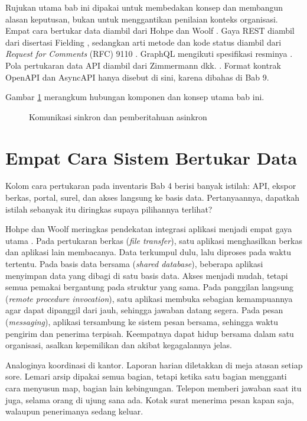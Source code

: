 Rujukan utama bab ini dipakai untuk membedakan konsep dan membangun alasan keputusan, bukan untuk menggantikan
penilaian konteks organisasi. Empat cara bertukar data diambil dari Hohpe dan Woolf \cite{c05-hohpe2003eip}. Gaya
REST diambil dari disertasi Fielding \cite{c05-fielding2000rest}, sedangkan arti metode dan kode status diambil
dari \textit{Request for Comments} (RFC) 9110 \cite{rfc9110}. GraphQL mengikuti spesifikasi resminya \cite{c05-graphql-spec}. Pola pertukaran data
API diambil dari Zimmermann dkk. \cite{zimmermann2022patterns}. Format kontrak OpenAPI \cite{openapi32} dan
AsyncAPI \cite{asyncapi31} hanya disebut di sini, karena dibahas di Bab 9.

Gambar \ref{fig:ch05-ilustrasi-bab} merangkum hubungan komponen dan konsep utama bab ini.
\begin{figure}[!htb]
  \centering
  
  \caption{Komunikasi sinkron dan pemberitahuan asinkron}
  \label{fig:ch05-ilustrasi-bab}
\end{figure}

\section{Empat Cara Sistem Bertukar Data}

Kolom cara pertukaran pada inventaris Bab 4 berisi banyak istilah: API, ekspor berkas, portal, surel, dan akses
langsung ke basis data. Pertanyaannya, dapatkah istilah sebanyak itu diringkas supaya pilihannya terlihat?

Hohpe dan Woolf meringkas pendekatan integrasi aplikasi menjadi empat gaya utama \cite{c05-hohpe2003eip}. Pada
pertukaran berkas (\textit{file transfer}), satu aplikasi menghasilkan berkas dan aplikasi lain membacanya. Data
terkumpul dulu, lalu diproses pada waktu tertentu. Pada basis data bersama (\textit{shared database}), beberapa
aplikasi menyimpan data yang dibagi di satu basis data. Akses menjadi mudah, tetapi semua pemakai bergantung pada
struktur yang sama. Pada panggilan langsung (\textit{remote procedure invocation}), satu aplikasi membuka sebagian
kemampuannya agar dapat dipanggil dari jauh, sehingga jawaban datang segera. Pada pesan (\textit{messaging}),
aplikasi tersambung ke sistem pesan bersama, sehingga waktu pengirim dan penerima terpisah. Keempatnya dapat hidup
bersama dalam satu organisasi, asalkan kepemilikan dan akibat kegagalannya jelas.

Analoginya koordinasi di kantor. Laporan harian diletakkan di meja atasan setiap sore. Lemari arsip dipakai semua
bagian, tetapi ketika satu bagian mengganti cara menyusun map, bagian lain kebingungan. Telepon memberi jawaban saat
itu juga, selama orang di ujung sana ada. Kotak surat menerima pesan kapan saja, walaupun penerimanya sedang keluar.

